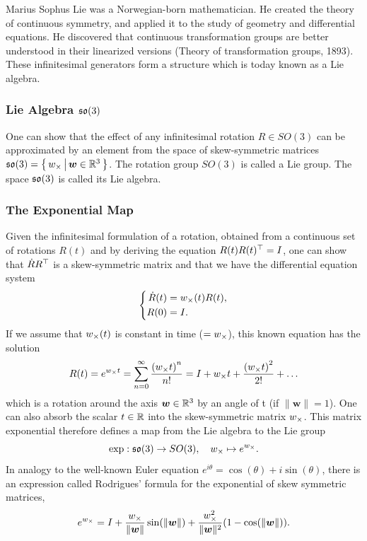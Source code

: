 Marius Sophus Lie was a Norwegian-born mathematician.
He created the theory of continuous symmetry, and applied it to
the study of geometry and differential equations.
He discovered that continuous transformation
groups are better understood in their linearized versions
(Theory of transformation groups, 1893).
These infinitesimal generators form a structure which is today
known as a Lie algebra.


\subsubsection{Lie Algebra $\mathfrak{so}(3)$}%
\label{ssub:lie_algebra_so3}

One can show that the effect of any infinitesimal
rotation $R \in SO(3)$ can be approximated by an element from
the space of skew-symmetric matrices
$\mathfrak{so}(3) = \left\{\, {{w}_{\times}} \, \middle| \, {\bm{w} \in \mathbb{R}^3} \,\right\}$.
The rotation group $SO(3)$ is called a Lie group.
The space $\mathfrak{so}(3)$ is called its Lie algebra.


\subsubsection{The Exponential Map}%
\label{ssub:the_exponential_map}

Given the infinitesimal formulation of a rotation,
obtained from a continuous set of rotations $R(t)$
and by deriving the equation $R(t)R(t)^{\top} = I$,
one can show that $\dot{R}R^{\top}$ is a skew-symmetric matrix
and that we have the differential equation system
\[\left\{
	\begin{aligned}
		\dot{R}(t) &= {w}_{\times}(t)R(t), \\
		R(0) &= I. \\
	\end{aligned}
\right.\]
If we assume that ${w}_{\times}(t)$ is constant in time ($={w}_{\times}$),
this known equation has the solution
\[
	R(t) = e^{{w}_{\times}t}
		= \sum_{n=0}^{\infty} \frac{{({w}_{\times}t)}^n }{n!}
		= I + {w}_{\times}t + \frac{{({w}_{\times}t)}^2 }{2!} + \ldots
\]
which is a rotation around the axis $\bm{w} \in \mathbb{R}^3$
by an angle of t (if $\|\bm{w}\| = 1$).
One can also absorb the scalar $t \in \mathbb{R}$ into the skew-symmetric matrix ${w}_{\times}$.
This matrix exponential therefore defines a map from
the Lie algebra to the Lie group
\[
	\exp : \mathfrak{so}(3) \rightarrow SO(3), \quad {w}_{\times}\mapsto e^{{w}_{\times}}.
\]
In analogy to the well-known Euler equation
$e^{i\theta} = \cos(\theta) + i \sin(\theta)$,
there is an expression called Rodrigues' formula for
the exponential of skew symmetric matrices,
\[
	e^{{w}_{\times}} = I + \frac{{w}_{\times}}{\|\bm{w}\|} \sin(\|\bm{w}\|)
		+ \frac{{w}_{\times}^2}{\|\bm{w}\|^2} (1 - \cos(\|\bm{w}\|)).
\]

